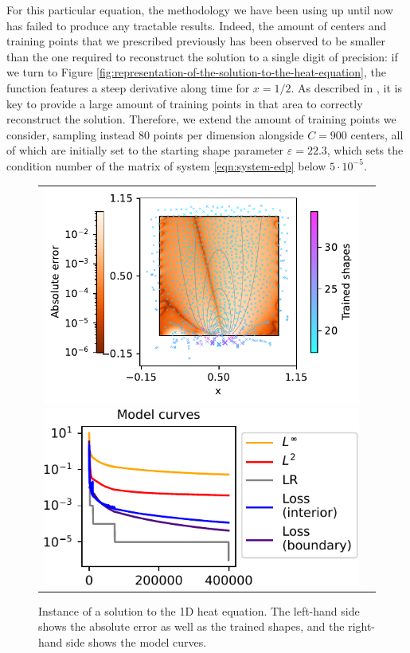 \documentclass[12pt]{report} %
\begin{document}
For this particular equation, the methodology we have been using up until now has failed to produce any tractable results. 
Indeed, the amount of centers and training points that we prescribed previously has been observed to be smaller than the one required to reconstruct the solution to a single digit of precision: if we turn to Figure \ref{fig:representation-of-the-solution-to-the-heat-equation}, the function features a steep derivative along time for $x=1/2$. As described in \cite{abrahamsen2019explicit}, it is key to provide a large amount of training points in that area to correctly reconstruct the solution. Therefore, we extend the amount of training points we consider, sampling instead $80$ points per dimension alongside $C=900$ centers, all of which are initially set to the starting shape parameter $\varepsilon=22.3$, which sets the condition number of the matrix of system  \eqref{eqn:system-edp} below $5 \cdot 10^{-5}$.

\begin{figure}
  \hspace*{-2cm}
  \begin{tabular}{cc}
    {\includegraphics[height=.24\textheight]{imagenes/experiments/2d/heat_1d/new_graphics/900_80.pdf}}
    {\includegraphics[height=.22\textheight]{imagenes/experiments/2d/heat_1d/new_graphics/heat_1d-TR80-C900-11-E399488_cropped.pdf}}
  \end{tabular}
  \caption{Instance of a solution to the 1D heat equation. The left-hand side shows the absolute error as well as the trained shapes, and the right-hand side shows the model curves.}
  \label{fig:heat-1d-experiment-model-instance}
\end{figure}
\end{document}
